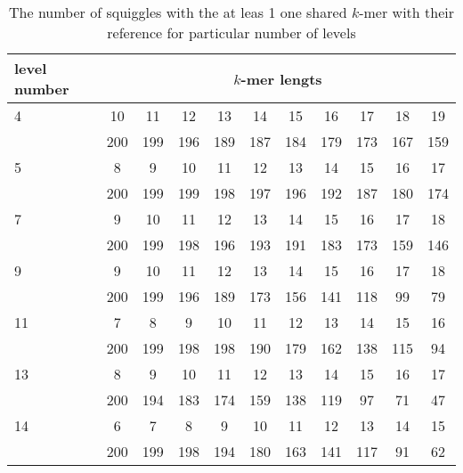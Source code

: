 \begin{table}
\caption[TODO]{The number of squiggles with the at leas 1 one shared $k$-mer with their
reference for particular number of levels}
\label{tab:sharedKmers}
\begin{center}
\begin{tabular}{|l|c|c|c|c|c|c|c|c|c|c|}
\hline
level number & \multicolumn{10}{|c|}{$k$-mer lengts} \\
\hline
4 & 10 & 11 & 12 & 13 & 14 & 15 & 16 & 17 & 18 & 19 \\\cline{2-11}
& 200 & 199 & 196 & 189 & 187 & 184 & 179 & 173 & 167 & 159 \\
\hline
5 & 8 & 9 & 10 & 11 & 12 & 13 & 14 & 15 & 16 & 17 \\\cline{2-11}
& 200 & 199 & 199 & 198 & 197 & 196 & 192 & 187 & 180 & 174 \\
\hline
7 & 9 & 10 & 11 & 12 & 13 & 14 & 15 & 16 & 17 & 18 \\\cline{2-11}
& 200 & 199 & 198 & 196 & 193 & 191 & 183 & 173 & 159 & 146 \\
\hline
9 & 9 & 10 & 11 & 12 & 13 & 14 & 15 & 16 & 17 & 18 \\\cline{2-11}
& 200 & 199 & 196 & 189 & 173 & 156 & 141 & 118 & 99 & 79 \\
\hline
11 & 7 & 8 & 9 & 10 & 11 & 12 & 13 & 14 & 15 & 16 \\\cline{2-11}
& 200 & 199 & 198 & 198 & 190 & 179 & 162 & 138 & 115 & 94 \\
\hline
13 & 8 & 9 & 10 & 11 & 12 & 13 & 14 & 15 & 16 & 17 \\\cline{2-11}
& 200 & 194 & 183 & 174 & 159 & 138 & 119 & 97 & 71 & 47 \\
\hline
14 & 6 & 7 & 8 & 9 & 10 & 11 & 12 & 13 & 14 & 15 \\\cline{2-11}
& 200 & 199 & 198 & 194 & 180 & 163 & 141 & 117 & 91 & 62 \\
\hline
\end{tabular}
\end{center}
\end{table}
